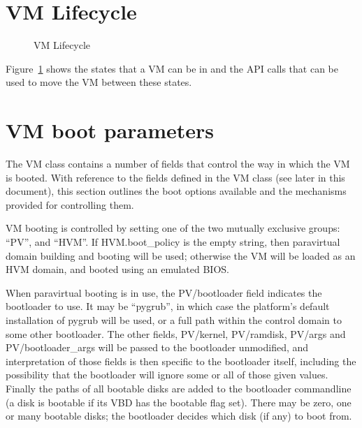 %
%
%
%

\section{VM Lifecycle}

\begin{figure}
\centering
{}
\caption{VM Lifecycle}
\label{fig-vm-lifecycle}
\end{figure}

Figure~\ref{fig-vm-lifecycle} shows the states that a VM can be in
and the API calls that can be used to move the VM between these states.

\section{VM boot parameters}

The VM class contains a number of fields that control the way in which the VM is booted.
With reference to the fields defined in the VM class (see later in this document),
this section outlines the boot options available and the mechanisms provided for controlling them.

VM booting is controlled by setting one of the two mutually exclusive groups: ``PV'', and ``HVM''.  If HVM.boot\_policy is the empty string, then paravirtual domain building and booting will be used; otherwise the VM will be loaded as an HVM domain, and booted using an emulated BIOS.

When paravirtual booting is in use, the PV/bootloader field indicates the bootloader to use.  It may be ``pygrub'', in which case the platform's default installation of pygrub will be used, or a full path within the control domain to some other bootloader.  The other fields, PV/kernel, PV/ramdisk, PV/args and PV/bootloader\_args will be passed to the bootloader unmodified, and interpretation of those fields is then specific to the bootloader itself, including the possibility that the bootloader will ignore some or all of those given values. Finally the paths of all bootable disks are added to the bootloader commandline (a disk is bootable if its VBD has the bootable flag set). There may be zero, one or many bootable disks; the bootloader decides which disk (if any) to boot from.

